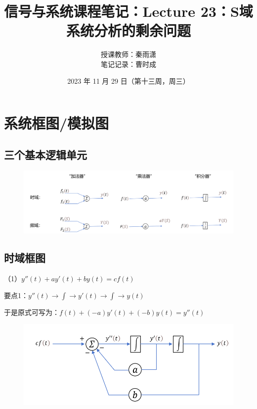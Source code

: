 \documentclass[UTF8]{ctexart}
\begin{document}
\title{信号与系统课程笔记：Lecture 23：S域系统分析的剩余问题}
\author{授课教师：秦雨潇 \\
        笔记记录：曹时成}
\date{2023 年 11 月 29 日（第十三周，周三）}
\maketitle

\section{系统框图/模拟图}
\subsection{三个基本逻辑单元}
\begin{figure}[h]
    \raggedright   %
    \includegraphics[scale=0.25]{1.png}
\end{figure}
\subsection{时域框图}
（1）$y''(t) + ay'(t) + by(t) = cf(t)$ \par
要点1：$y''(t)\longrightarrow \boxed{\text{$\int $}}\longrightarrow y'(t)\longrightarrow \boxed{\text{$\int $}}\longrightarrow y(t)$ \par
于是原式可写为：$f(t) +(-a)y'(t) + (-b)y(t)=y''(t)$ \par
\begin{figure}[h]
    \centering         %
    \includegraphics[scale=0.60]{2.png}
\end{figure}
\qquad  \par
\end{document}
